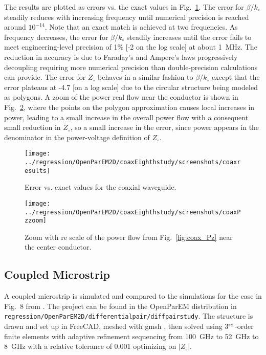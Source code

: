 \documentclass[titlepage]{article}
\renewcommand\_{\textunderscore\linebreak[1]}
\begin{document}
The results are plotted as errors vs. the exact values in Fig.~\ref{fig:coax_results}. The error for $\beta/k_{\circ}$ steadily reduces with increasing frequency until numerical precision is reached around $10^{-14}$.  Note that an exact match is achieved at two frequencies.  As frequency decreases, the error for $\beta/k_{\circ}$ steadily increases until the error fails to meet engineering-level precision of 1\% [-2 on the log scale] at about 1~MHz.  The reduction in accuracy is due to Faraday's and Ampere's laws progressively decoupling requiring more numerical precision than double-precision calculations can provide.  The error for $Z_{\circ}$ behaves in a similar fashion to $\beta/k_{\circ}$ except that the error plateaus at -4.7 [on a log scale] due to the circular structure being modeled as polygons. A zoom of the power real flow near the conductor is shown in Fig.~\ref{fig:coax_Pz_zoom}, where the points on the polygon approximation causes local increases in power, leading to a small increase in the overall power flow with a consequent small reduction in $Z_{\circ}$, so a small increase in the error, since power appears in the denominator in the power-voltage definition of $Z_{\circ}$.
\begin{figure}[H]
  \centering
  \texttt{[image: ../regression/OpenParEM2D/coaxEighth\_study/screenshots/coax\_results]}
  \caption{Error vs. exact values for the coaxial waveguide.}
  \label{fig:coax_results}
\end{figure}
\begin{figure}[H]
  \centering
  \texttt{[image: ../regression/OpenParEM2D/coaxEighth\_study/screenshots/coax\_Pz\_zoom]}
  \caption{Zoom with re scale of the power flow from Fig.~\ref{fig:coax_Pz} near the center conductor.}
  \label{fig:coax_Pz_zoom}
\end{figure}

\subsection{Coupled Microstrip}

A coupled microstrip is simulated and compared to the simulations for the case in Fig.~8 from \cite{Olyslager}.  The project can be found in the OpenParEM distribution in \texttt{regression/OpenParEM2D/differential\_pair/diff\_pair\_study}.  The structure is drawn and set up in FreeCAD, meshed with gmsh \cite{gmsh}\cite{gmshweb}, then solved using 3$^{\textnormal{rd}}$-order finite elements with adaptive refinement sequencing from 100~GHz to 52~GHz to 8~GHz with a relative tolerance of 0.001 optimizing on $|Z_{\circ}|$.
\end{document}
